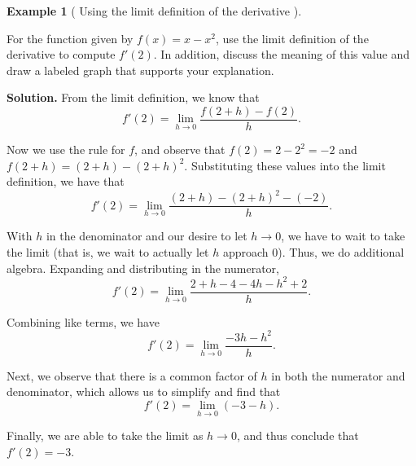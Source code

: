 \documentclass[10pt,]{book}
\theoremstyle{plain}
\theoremstyle{definition}
\theoremstyle{definition}
\theoremstyle{definition}
\newtheorem{example}[theorem]{Example}
\theoremstyle{definition}
\theoremstyle{definition}
\numberwithin{equation}{section}
\begin{document}
\begin{example}[ Using the limit definition of the derivative
  ]\label{example-3}

For the function given by \(f(x) = x - x^2\), use the limit definition of the derivative to compute \(f'(2)\). In addition, discuss the meaning of this value and draw a labeled graph that supports your explanation.
%
\par\medskip\noindent%
\textbf{Solution.}\quad 
    From the limit definition, we know that
\begin{equation*}
    f'(2) = \lim_{h \to 0} \frac{f(2+h)-f(2)}{h}.
    \end{equation*}\par

    Now we use the rule for \(f\), and observe that \(f(2) = 2 - 2^2 = -2\) and \(f(2+h) = (2+h) - (2+h)^2.\) Substituting these values into the limit definition, we have that
\begin{equation*}
    f'(2) = \lim_{h \to 0} \frac{(2+h) - (2+h)^2 -  (-2)}{h}.
    \end{equation*}\par

    With \(h\) in the denominator and our desire to let \(h \to 0\), we have to wait to take the limit (that is, we wait to actually let \(h\) approach 0). Thus, we do additional algebra. Expanding and distributing in the numerator,
\begin{equation*}
    f'(2) = \lim_{h \to 0} \frac{2+h - 4 - 4h - h^2 + 2}{h}.
    \end{equation*}\par

    Combining like terms, we have
\begin{equation*}
    f'(2) = \lim_{h \to 0} \frac{ -3h - h^2}{h}.
    \end{equation*}\par

    Next, we observe that there is a common factor of \(h\) in both the numerator and denominator, which allows us to simplify and find that
\begin{equation*}
    f'(2) = \lim_{h \to 0} (-3-h).
    \end{equation*}\par

    Finally, we are able to take the limit as \(h \to 0\), and thus conclude that \(f'(2) = -3\).
\par


\end{example}
\end{document}
